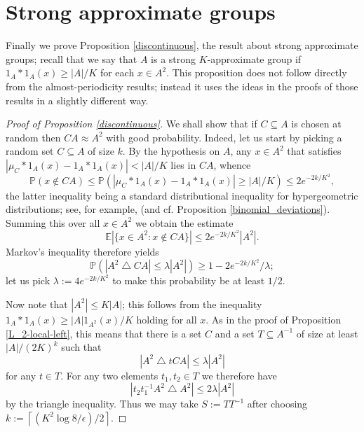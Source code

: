 \documentclass[12pt,a4paper,reqno]{amsart}
\numberwithin{equation}{section}
\theoremstyle{plain}
\theoremstyle{definition}
\renewcommand{\leq}{\leqslant}
\renewcommand{\geq}{\geqslant}
\renewcommand{\subset}{\subseteq}
\def\E{\mathbb{E}}
\def\P{\mathbb{P}}
\begin{document}
\section{Strong approximate groups}\label{discts}
Finally we prove Proposition \ref{discontinuous}, the result about strong approximate groups; recall that we say that $A$ is a strong $K$-approximate group if $1_A*1_A(x) \geq |A|/K$ for each $x \in A^2$. This proposition does not follow directly from the almost-periodicity results; instead it uses the ideas in the proofs of those results in a slightly different way.

\begin{proof}[Proof of Proposition \ref{discontinuous}]
We shall show that if $C \subset A$ is chosen at random then $CA \approx A^2$ with good probability. Indeed, let us start by picking a random set $C \subset A$ of size $k$. By the hypothesis on $A$, any $x \in A^2$ that satisfies $|\mu_C*1_A(x) - 1_A*1_A(x)| < |A|/K$ lies in $CA$, whence
\[ \P( x \notin CA ) \leq \P\left( |\mu_C*1_A(x) - 1_A*1_A(x)| \geq |A|/K \right) \leq 2e^{-2k/K^2}, \]
the latter inequality being a standard distributional inequality for hypergeometric distributions; see, for example, \cite{chvatal} (and cf. Proposition \ref{binomial_deviations}). Summing this over all $x \in A^2$ we obtain the estimate
\[ \E |\{ x \in A^2 : x \notin CA \}| \leq 2e^{-2k/K^2} |A^2|. \]
Markov's inequality therefore yields
\[ \P\left( |A^2 \bigtriangleup CA| \leq \lambda |A^2| \right) \geq 1 - 2e^{-2k/K^2}/\lambda; \]
let us pick $\lambda := 4e^{-2k/K^2}$ to make this probability be at least $1/2$.

Now note that $|A^2| \leq K|A|$; this follows from the inequality $1_A*1_A(x) \geq |A| 1_{A^2}(x)/K$ holding for all $x$. As in the proof of Proposition \ref{L_2-local-left}, this means that there is a set $C$ and a set $T \subset A^{-1}$ of size at least $|A|/(2K)^k$ such that 
\[ |A^2 \bigtriangleup tCA| \leq \lambda |A^2| \]
for any $t \in T$. For any two elements $t_1, t_2 \in T$ we therefore have
\[ | t_2 t_1^{-1} A^2 \bigtriangleup A^2 | \leq 2\lambda |A^2| \]
by the triangle inequality. Thus we may take $S := T T^{-1}$ after choosing $k := \left\lceil (K^2\log{8/\epsilon})/2 \right\rceil$.
\end{proof}
\end{document}
